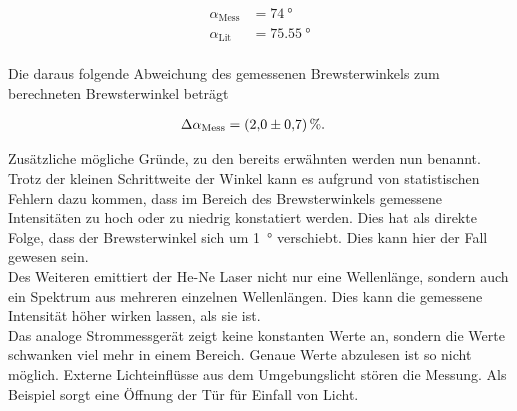 \begin{align*}
    \alpha_\text{Mess} &= \qty{74}{\degree} \\
    \alpha_\text{Lit}  &= \qty{75.55}{\degree} \\
\end{align*}

\noindent Die daraus folgende Abweichung des gemessenen Brewsterwinkels zum berechneten Brewsterwinkel beträgt 

\begin{align*}
    \Delta \alpha_\text{Mess} &= \qty{2.0\pm0.7}{\percent}.
\end{align*}

\noindent Zusätzliche mögliche Gründe, zu den bereits erwähnten werden nun benannt.\\
\noindent Trotz der kleinen Schrittweite der Winkel kann es aufgrund von statistischen Fehlern dazu kommen, dass im Bereich 
des Brewsterwinkels gemessene Intensitäten zu hoch oder zu niedrig konstatiert werden. Dies hat als direkte Folge, dass der 
Brewsterwinkel sich um \qty{1}{\degree} verschiebt. Dies kann hier der Fall gewesen sein.\\
\noindent Des Weiteren emittiert der He-Ne Laser nicht nur eine Wellenlänge, sondern auch ein Spektrum aus mehreren einzelnen 
Wellenlängen. Dies kann die gemessene Intensität höher wirken lassen, als sie ist.\\
\noindent Das analoge Strommessgerät zeigt keine konstanten Werte an, sondern die Werte schwanken viel mehr in einem Bereich. 
Genaue Werte abzulesen ist so nicht möglich. Externe Lichteinflüsse aus dem Umgebungslicht stören die Messung. Als Beispiel 
sorgt eine Öffnung der Tür für Einfall von Licht.






